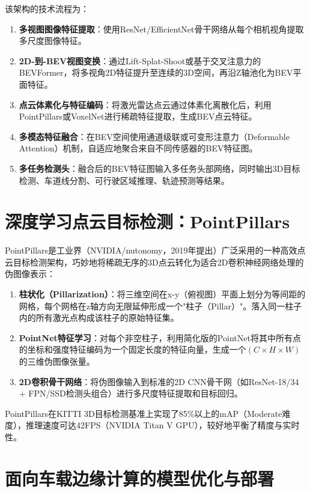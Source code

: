 \documentclass[12pt,a4paper,openany,UTF8]{ctexbook}
\begin{document}
该架构的技术流程为：

\begin{enumerate}
    \item \textbf{多视图图像特征提取}：使用ResNet/EfficientNet骨干网络从每个相机视角提取多尺度图像特征。
    \item \textbf{2D-到-BEV视图变换}：通过Lift-Splat-Shoot或基于交叉注意力的BEVFormer，将多视角2D特征提升至连续的3D空间，再沿Z轴池化为BEV平面特征。
    \item \textbf{点云体素化与特征编码}：将激光雷达点云通过体素化离散化后，利用PointPillars或VoxelNet进行稀疏特征提取，生成BEV点云特征。
    \item \textbf{多模态特征融合}：在BEV空间使用通道级联或可变形注意力（Deformable Attention）机制，自适应地聚合来自不同传感器的BEV特征图。
    \item \textbf{多任务检测头}：融合后的BEV特征图输入多任务头部网络，同时输出3D目标检测、车道线分割、可行驶区域推理、轨迹预测等结果。
\end{enumerate}

\section{深度学习点云目标检测：PointPillars}

PointPillars是工业界（NVIDIA/nutonomy，2019年提出）广泛采用的一种高效点云目标检测架构，巧妙地将稀疏无序的3D点云转化为适合2D卷积神经网络处理的伪图像表示：

\begin{enumerate}
    \item \textbf{柱状化（Pillarization）}：将三维空间在x-y（俯视图）平面上划分为等间距的网格，每个网格在z轴方向无限延伸形成一个"柱子（Pillar）"。落入同一柱子内的所有激光点构成该柱子的原始特征集。
    \item \textbf{PointNet特征学习}：对每个非空柱子，利用简化版的PointNet将其中所有点的坐标和强度特征编码为一个固定长度的特征向量，生成一个$(C \times H \times W)$的三维伪图像张量。
    \item \textbf{2D卷积骨干网络}：将伪图像输入到标准的2D CNN骨干网（如ResNet-18/34 + FPN/SSD检测头组合）进行多尺度特征提取和目标回归。
\end{enumerate}

PointPillars在KITTI 3D目标检测基准上实现了85\%以上的mAP（Moderate难度），推理速度可达42FPS（NVIDIA Titan V GPU），较好地平衡了精度与实时性。

\section{面向车载边缘计算的模型优化与部署}
\end{document}
